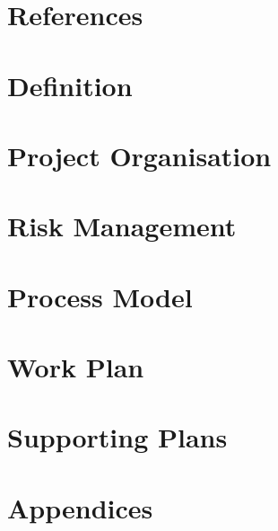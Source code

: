\documentclass[10pt,a4paper,titlepage]{article}
\begin{document}
	\section{References}
		
	\section{Definition}
		
	\section{Project Organisation}
		
	\section{Risk Management}
		
	\newpage
	\section{Process Model}
		
	\section{Work Plan}
		
	\newpage
	\section{Supporting Plans}
			
	\newpage
	\section{Appendices}
		
	
\end{document}
